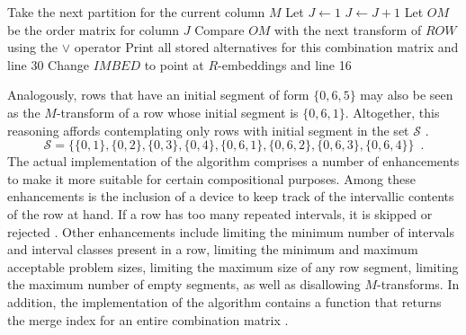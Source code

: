 \setlength{\interspacetitleruled}{0pt}%
\setlength{\algotitleheightrule}{0pt}%

\begin{algorithm}
\DontPrintSemicolon
\setcounter{AlgoLine}{39}
Take the next partition for the current column $M$\;
Let $J \gets 1$\;
$J \gets J + 1$\;
Let $OM$ be the order matrix for column $J$\;
Compare $OM$ with the next transform of $ROW$ using the $\lor$ operator\;
Print all stored alternatives for this combination matrix and \KwGoTo line 30\;
Change $IMBED$ to point at $R$-embeddings and \KwGoTo line 16\;
\end{algorithm}

\noindent Analogously, rows that have an initial segment of form $\{0, 6, 5\}$ may also be seen as the $M$-transform of a row whose initial segment is $\{0, 6, 1\}$. Altogether, this reasoning affords contemplating only rows with initial segment in the set $\mathcal{S}$ \cite[35]{Kowalski1987b}.
\begin{equation}
	\label{eq:initial-segment}
	\mathcal{S} = \{\{0, 1\}, \{0, 2\}, \{0, 3\}, \{0, 4\}, \{0, 6, 1\}, \{0, 6, 2\}, \{0, 6, 3\}, \{0, 6, 4\}\} \enspace.
\end{equation}
\noindent The actual implementation of the algorithm comprises a number of enhancements to make it more suitable for certain compositional purposes. Among these enhancements is the inclusion of a device to keep track of the intervallic contents of the row at hand. If a row has too many repeated intervals, it is skipped or rejected \cite[37]{Kowalski1987b}. Other enhancements include limiting the minimum number of intervals and interval classes present in a row, limiting the minimum and maximum acceptable problem sizes, limiting the maximum size of any row segment, limiting the maximum number of empty segments, as well as disallowing $M$-transforms. In addition, the implementation of the algorithm contains a function that returns the merge index for an entire combination matrix \cite[38]{Kowalski1987b}.

